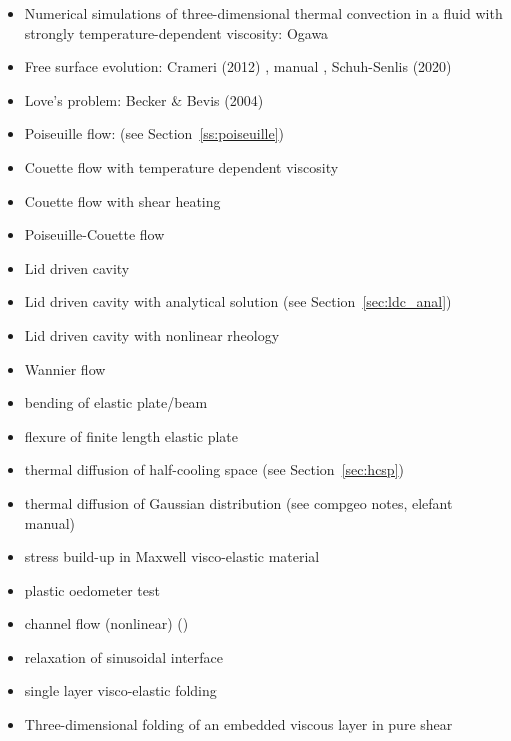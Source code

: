 \begin{itemize}
\item Numerical simulations of three-dimensional thermal convection in a fluid with strongly
      temperature-dependent viscosity: Ogawa \etal \cite{ogsz91,kaks05} 

\item Free surface evolution: Crameri \etal (2012) \cite{crsg12}, \aspect{} manual \cite{aspectmanual},
                              Schuh-Senlis \etal (2020) \cite{sctc20}
\item Love's problem: Becker \& Bevis (2004) \cite{bebe04}
\item Poiseuille flow: \cite{fojg94,fuku11,tagm09} (see Section~\ref{ss:poiseuille})
\item Couette flow with temperature dependent viscosity \cite{egat10,demh19}
\item Couette flow with shear heating \cite{egat10}
\item Poiseuille-Couette flow \cite{fusc13}
\item Lid driven cavity \cite{kawa61,chor67,shry78,foth79,ghgs82,kost84,bope98,xika01,brsa06,ertu09}
\item Lid driven cavity with analytical solution (see Section~\ref{sec:ldc_anal})
\item Lid driven cavity with nonlinear rheology \cite{been80,svna18}
\item Wannier flow \cite{wann50,yemu99,cehg14}
\item bending of elastic plate/beam \cite{cehg14,boht08a,vosc15,egat10,demh19,modm02,litu02}
\item flexure of finite length elastic plate \cite{chtl13}
\item thermal diffusion of half-cooling space (see Section~\ref{sec:hcsp}) 
\item thermal diffusion of Gaussian distribution (see compgeo notes, elefant manual)
\item stress build-up in Maxwell visco-elastic material \cite{geyu07,chtl13,egat10,demh19}
\item plastic oedometer test  \cite{chtl13}
\item channel flow (nonlinear) \cite{maie12,frbt19,gery10,egat10} (\bscthesis) 
\item relaxation of sinusoidal interface \cite{crsg12,robh17}
\item single layer visco-elastic folding \cite{scps01,vosc15}
\item Three-dimensional folding of an embedded viscous layer in pure shear \cite{flet91}

\end{itemize}
